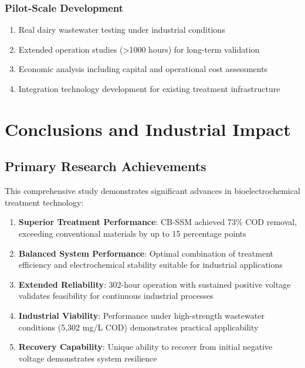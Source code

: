 \documentclass[12pt,a4paper]{article}
\begin{document}
\subsubsection{Pilot-Scale Development}

\begin{enumerate}
    \item Real dairy wastewater testing under industrial conditions
    \item Extended operation studies (>1000 hours) for long-term validation
    \item Economic analysis including capital and operational cost assessments
    \item Integration technology development for existing treatment infrastructure
\end{enumerate}

\section{Conclusions and Industrial Impact}

\subsection{Primary Research Achievements}

This comprehensive study demonstrates significant advances in bioelectrochemical treatment technology:

\begin{enumerate}
    \item \textbf{Superior Treatment Performance}: CB-SSM achieved 73\% COD removal, exceeding conventional materials by up to 15 percentage points
    
    \item \textbf{Balanced System Performance}: Optimal combination of treatment efficiency and electrochemical stability suitable for industrial applications
    
    \item \textbf{Extended Reliability}: 302-hour operation with sustained positive voltage validates feasibility for continuous industrial processes
    
    \item \textbf{Industrial Viability}: Performance under high-strength wastewater conditions (5,302 mg/L COD) demonstrates practical applicability
    
    \item \textbf{Recovery Capability}: Unique ability to recover from initial negative voltage demonstrates system resilience
\end{enumerate}
\end{document}
